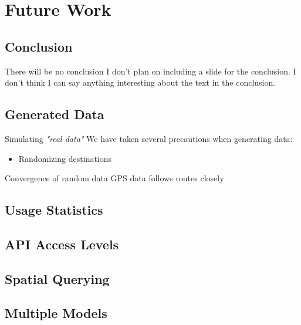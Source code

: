 \section{Future Work}
\subsection{Conclusion}
\begin{frame}{There will be no conclusion}
I don't plan on including a slide for the conclusion.
I don't think I can say anything interesting about the text in the conclusion.
\end{frame}

\subsection{Generated Data}
\begin{frame}{Simulating \textit{"real data"}}
We have taken several precautions when generating data:
\begin{itemize}
\item Randomizing destinations
\
\end{itemize}
\end{frame}

\begin{frame}{Convergence of random data}
GPS data follows routes closely

\end{frame}

\subsection{Usage Statistics}
\subsection{API Access Levels}
\subsection{Spatial Querying}
\subsection{Multiple Models}